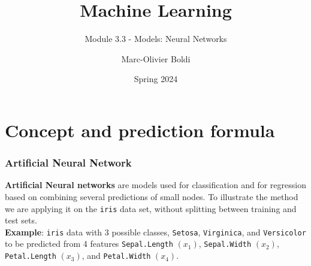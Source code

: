 
\title{Machine Learning}
\subtitle{Module 3.3 - Models: Neural Networks}
\author[MOB]{Marc-Olivier Boldi}
\date[Spring 2024]{Spring 2024}

	\begin{frame}
	\titlepage
	\end{frame}
\section{Concept and prediction formula}
\begin{frame}
\frametitle{Artificial Neural Network}
{\bf Artificial Neural networks} are models used for classification and for regression based on combining several predictions of small nodes. To illustrate the method we are applying it on the {\tt iris} data set, without splitting between training and test sets. \\ 
\vspace{0.3cm}
{\bf Example}: {\tt iris} data with 3 possible classes, {\tt Setosa}, {\tt Virginica}, and {\tt Versicolor} to be predicted from 4 features {\tt Sepal.Length} $(x_1)$, {\tt Sepal.Width} $(x_2)$, {\tt Petal.Length} $(x_3)$, and {\tt Petal.Width} $(x_4)$. 
\end{frame}
